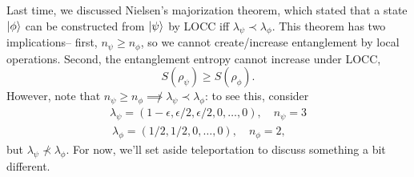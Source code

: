 Last time, we discussed Nielsen's majorization theorem, which stated that a state $\lvert\phi\rangle$ can be constructed from $\lvert\psi\rangle$ by LOCC iff $\lambda_\psi \prec \lambda_\phi$. This theorem has two implications-- first, $n_\psi \geq n_\phi$, so we cannot create/increase entanglement by local operations. Second, the entanglement entropy cannot increase under LOCC,
\begin{equation*}
    S(\rho_\psi) \geq S(\rho_\phi).
\end{equation*}
However, note that $n_\psi \geq n_\phi \not\implies \lambda_\psi \prec \lambda_\phi$: to see this, consider
\begin{align*}
    \lambda_\psi=(1-\epsilon, \epsilon/2, \epsilon/2, 0,\ldots, 0),\quad n_\psi = 3\\\
    \lambda_\phi = (1/2,1/2,0,\ldots,0),\quad n_\phi=2,
\end{align*}
but $\lambda_\psi \not \prec \lambda_\phi$. For now, we'll set aside teleportation to discuss something a bit different.


